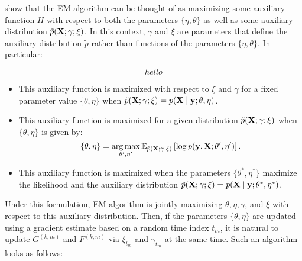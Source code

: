 \citet{Neal:1998} show that the EM algorithm can be thought of as maximizing some auxiliary function $H$ with respect to both the parameters $\{\eta,\theta\}$ as well as some auxiliary distribution $\tilde p (\bf X; \gamma;\xi)$. In this context, $\gamma$ and $\xi$ are parameters that define the auxiliary distribution $\tilde p$ rather than functions of the parameters $\{\eta,\theta\}$. In particular:

\begin{equation*}
    hello
\end{equation*}

\begin{itemize}
    \item This auxiliary function is maximized with respect to $\xi$ and $\gamma$ for a fixed parameter value $\{\theta,\eta\}$ when $\tilde p(\mathbf{X}; \gamma ; \xi) = p(\mathbf{X} \mid \mathbf{y}; \theta,\eta)$.
    \item This auxiliary function is maximized for a given distribution $\tilde p(\mathbf{X}; \gamma ; \xi)$ when $\{\theta,\eta\}$ is given by:
    \begin{equation}
        \left\{\theta,\eta\right\} = \operatorname*{arg\,max}_{\theta',\eta'} \mathbb{E}_{\tilde p(\mathbf{X} ; \gamma, \xi)} \left[\log p(\mathbf{y},\mathbf{X};\theta',\eta')\right].
    \end{equation}
    \item This auxiliary function is maximized when the parameters $\{\theta^*,\eta^*\}$ maximize the likelihood and the auxiliary distribution $\tilde p(\mathbf{X}; \gamma;\xi) = p(\mathbf{X} \mid \mathbf{y}; \theta^*,\eta^*)$.
\end{itemize}

Under this formulation, EM algorithm is jointly maximizing $\theta, \eta, \gamma$, and $\xi$ with respect to this auxiliary distribution. Then, if the parameters $\{\theta, \eta\}$ are updated using a gradient estimate based on a random time index $t_m$, it is natural to update $G^{(k,m)}$ and $F^{(k,m)}$ via $\xi_{t_m}$ and $\gamma_{t_m}$ at the same time. Such an algorithm looks as follows:

